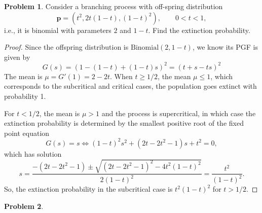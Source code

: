 \documentclass[oneside,reqno]{amsart}
\newcommand{\Bin}{\mathrm{Binomial}}
\theoremstyle{definition}
\newtheorem{prob}{Problem}
\begin{document}
\begin{prob}
Consider a branching process with off-spring distribution 
\[
	\mathbf p = \left(t^2, 2t(1-t), (1-t)^2\right), \qquad 0 < t < 1,
\]	
i.e., it is binomial with parameters $2$ and $1-t$. Find the extinction probability. 
\end{prob}

\begin{proof}
Since the offspring distribution is $\Bin(2,1-t)$, we know its PGF is given by
\[
	G(s)  = (1 - (1-t) + (1-t)s)^2 = (t+s - ts)^2
\]
The mean is $\mu = G'(1) = 2- 2t$. When $t  \geq 1/2$, the mean $\mu \leq 1$, which corresponds to the subcritical and critical cases, the population goes extinct with probability 1.
\par
For $t < 1/2$, the mean is $\mu > 1$ and the process is supercritical, in which case the extinction probability is determined by the smallest positive root of the fixed point equation
\[
	G(s)=s \iff (1-t)^2 s^2 + (2 t - 2t^2 - 1)s + t^2 = 0,
\] 
which has solution 
\[
	s = \frac{-(2t - 2t^2 - 1) \pm \sqrt{(2t - 2t^2 - 1)^2 - 4t^2(1- t)^2}}{2(1- t)^2}
	=\frac{t^2}{(1-t)^2}.
\]
So, the extinction probability in the subcritical case is $t^2(1-t)^2$ for $t > 1/2$.
\end{proof}

\begin{prob}
\end{prob}
\end{document}
